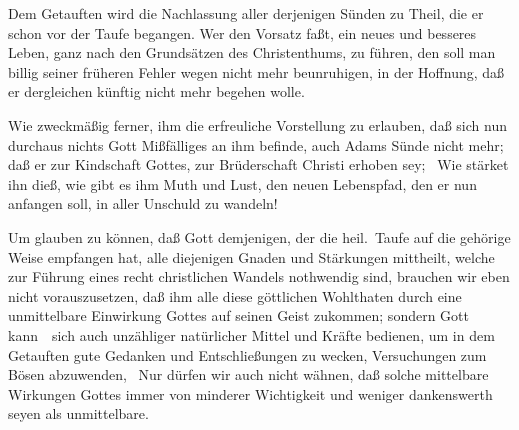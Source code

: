 \begin{aufza}
\begin{aufzb}
\item Dem Getauften wird die Nachlassung aller derjenigen Sünden zu Theil, die er schon vor der Taufe begangen. Wer den Vorsatz faßt, ein neues und besseres Leben, ganz nach den Grundsätzen des Christenthums, zu führen, den soll man billig seiner früheren Fehler wegen nicht mehr beunruhigen, in der Hoffnung, daß er dergleichen künftig nicht mehr begehen wolle.
\item Wie zweckmäßig ferner, ihm die erfreuliche Vorstellung zu erlauben, daß sich nun durchaus nichts Gott Mißfälliges an ihm befinde, auch Adams Sünde nicht mehr; daß er zur Kindschaft Gottes, zur Brüderschaft Christi erhoben sey; \usw\ Wie stärket ihn dieß, wie gibt es ihm Muth und Lust, den neuen Lebenspfad, den er nun anfangen soll, in aller Unschuld zu wandeln!
\item Um glauben zu können, daß Gott demjenigen, der die heil.\ Taufe auf die gehörige Weise empfangen hat, alle diejenigen Gnaden und Stärkungen mittheilt, welche zur Führung eines recht christlichen Wandels nothwendig sind, brauchen wir eben nicht vorauszusetzen, daß ihm alle diese göttlichen Wohlthaten durch eine unmittelbare Einwirkung Gottes auf seinen Geist zukommen; sondern Gott kann~\ sich auch unzähliger natürlicher Mittel und Kräfte bedienen, um in dem Getauften gute Gedanken und Entschließungen zu wecken, Versuchungen zum Bösen abzuwenden, \usw\ Nur dürfen wir auch nicht wähnen, daß solche mittelbare Wirkungen Gottes immer von minderer Wichtigkeit und weniger dankenswerth seyen als unmittelbare.
\end{aufzb}

\end{aufza}
